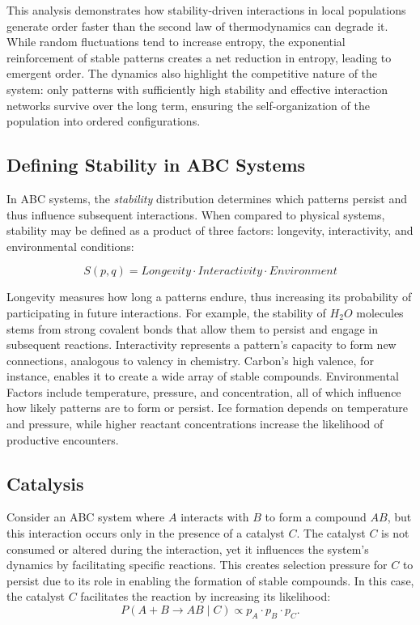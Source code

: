 \documentclass[entropy,article,submit,pdftex,moreauthors]{Definitions/mdpi}
\begin{document}
This analysis demonstrates how stability-driven interactions in local populations generate order faster than the second law of thermodynamics can degrade it. While random fluctuations tend to increase entropy, the exponential reinforcement of stable patterns creates a net reduction in entropy, leading to emergent order. The dynamics also highlight the competitive nature of the system: only patterns with sufficiently high stability and effective interaction networks survive over the long term, ensuring the self-organization of the population into ordered configurations.

\subsection{Defining Stability in ABC Systems}

In ABC systems, the \textit{stability} distribution determines which patterns persist and thus influence subsequent interactions. When compared to physical systems, stability may be defined as a product of three factors: longevity, interactivity, and environmental conditions:

\[
S(p, q) = Longevity \cdot Interactivity \cdot Environment
\]

Longevity measures how long a patterns endure, thus increasing its probability of participating in future interactions. For example, the stability of \(H_2O\) molecules stems from strong covalent bonds that allow them to persist and engage in subsequent reactions. Interactivity represents a pattern’s capacity to form new connections, analogous to valency in chemistry. Carbon’s high valence, for instance, enables it to create a wide array of stable compounds. Environmental Factors include temperature, pressure, and concentration, all of which influence how likely patterns are to form or persist. Ice formation depends on temperature and pressure, while higher reactant concentrations increase the likelihood of productive encounters.

\subsection{Catalysis}

Consider an ABC system where \( A \) interacts with \( B \) to form a compound \( AB \), but this interaction occurs only in the presence of a catalyst \( C \). The catalyst \( C \) is not consumed or altered during the interaction, yet it influences the system's dynamics by facilitating specific reactions. This creates selection pressure for \( C \) to persist due to its role in enabling the formation of stable compounds. In this case, the catalyst \( C \) facilitates the reaction by increasing its likelihood:
\[
P(A + B \to AB \mid C) \propto p_A \cdot p_B \cdot p_C.
\]
\end{document}
